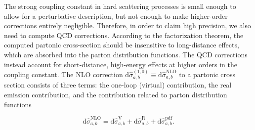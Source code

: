 \documentclass[a4paper, 12pt]{book}
\begin{document}
The strong coupling constant in hard scattering processes is small enough to allow for a perturbative description, but not enough to make higher-order corrections entirely negligible. Therefore, in order to claim high precision, we also need to compute QCD corrections. According to the factorization theorem, the computed partonic cross-section should be insensitive to long-distance effects, which are absorbed into the parton distribution functions. The QCD corrections instead account for short-distance, high-energy effects at higher orders in the coupling constant. The NLO correction $\text{d} \hat{\sigma}_{a,b}^{(1,0)} \equiv \text{d} \hat{\sigma}_{a,b}^{\mathrm{NLO}} $ to a partonic cross section consists of three terms: the one-loop (virtual) contribution, the real emission contribution, and the contribution related to parton distribution functions


\begin{equation}
    \mathrm{d} \hat{\sigma}_{a,b}^{\mathrm{NLO}} = \mathrm{d} \hat{\sigma}_{a,b}^{\mathrm{V}} + \mathrm{d} \hat{\sigma}_{a,b}^{\mathrm{R}} + \mathrm{d} \hat{\sigma}_{a,b}^{\mathrm{pdf}}.
\end{equation} 
\end{document}
